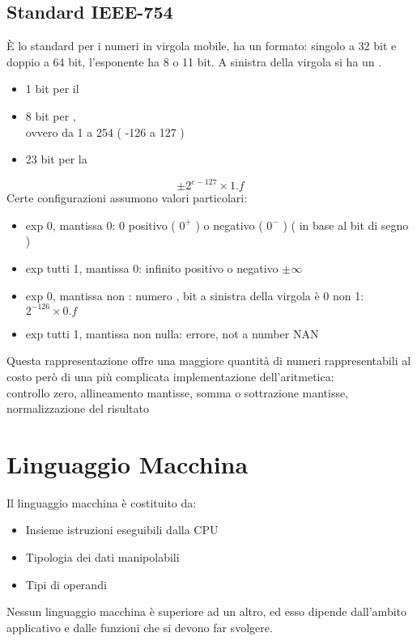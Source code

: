 \documentclass[arch.tex]{subfiles}
\begin{document}
\subsection{Standard IEEE-754}%
\label{sub:standard_ieee754}
È lo standard per i numeri in virgola mobile, ha un  formato: singolo
a 32 bit e doppio a 64 bit, l'esponente ha 8 o 11 bit. A sinistra della virgola si ha
un .

%
\label{ppar:FORMATO SINGOLO}
\begin{itemize}
	\item 1 bit per il  
	\item 8 bit per ,\\
		ovvero da 1 a 254 ( -126 a 127 ) 
	\item 23 bit per la  
\end{itemize}

\begin{equation}
	\pm 2^{e - 127} \times 1.f
\end{equation}
Certe configurazioni assumono valori particolari:

\begin{itemize}
	\item exp 0, mantissa 0: 0 positivo ( $0^+$ )  o negativo ( $ 0^- $  ) 
		( in base al bit di segno )
	\item exp tutti 1, mantissa 0: infinito positivo o negativo $ \pm  \infty $
	\item exp 0, mantissa non : numero ,
		bit a sinistra della virgola è 0 non 1: $ 2^{-126} \times 0.f $ 
	\item exp tutti 1, mantissa non nulla: errore, not a number NAN
\end{itemize}
Questa rappresentazione offre una maggiore quantità di numeri rappresentabili al costo
però di una più complicata implementazione dell'aritmetica:\\
controllo zero, allineamento mantisse, somma o sottrazione mantisse, normalizzazione del
risultato

\section{Linguaggio Macchina}%
\label{sub:linguaggio_macchina}

Il linguaggio macchina è costituito da:
\begin{itemize}
	\item Insieme istruzioni eseguibili dalla CPU
	\item Tipologia dei dati manipolabili
	\item Tipi di operandi
\end{itemize}
Nessun linguaggio macchina è superiore ad un altro, ed esso dipende dall'ambito
applicativo e dalle funzioni che si devono far svolgere.
\end{document}
